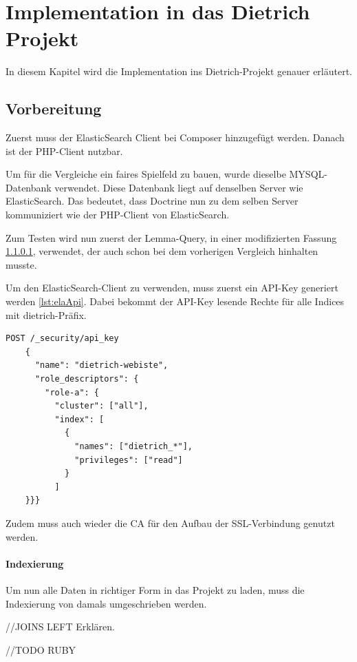 \chapter{Implementation in das Dietrich Projekt}

In diesem Kapitel wird die Implementation ins Dietrich-Projekt genauer erläutert.

\section{Vorbereitung}

Zuerst muss der ElasticSearch Client bei Composer hinzugefügt werden. Danach ist der PHP-Client nutzbar. 

Um für die Vergleiche ein faires Spielfeld zu bauen, wurde dieselbe MYSQL-Datenbank verwendet. Diese Datenbank liegt auf denselben Server wie ElasticSearch. Das bedeutet, dass Doctrine nun zu dem selben Server kommuniziert wie der PHP-Client von ElasticSearch.

Zum Testen wird nun zuerst der Lemma-Query, in einer modifizierten Fassung \ref{lemmaIndexierungEla}, verwendet, der auch schon bei dem vorherigen Vergleich hinhalten musste.

Um den ElasticSearch-Client zu verwenden, muss zuerst ein API-Key generiert werden \ref{lst:elaApi}. Dabei bekommt der API-Key lesende Rechte für alle Indices mit dietrich-Präfix. 

\begin{lstlisting}[language=XML, frame=single, label={lst:elaApi}] 
    POST /_security/api_key
    {
      "name": "dietrich-webiste",
      "role_descriptors": { 
        "role-a": {
          "cluster": ["all"],
          "index": [
            {
              "names": ["dietrich_*"],
              "privileges": ["read"]
            }
          ]
    }}}
\end{lstlisting}

Zudem muss auch wieder die CA für den Aufbau der SSL-Verbindung genutzt werden.


\subsubsection{Indexierung}
\label{lemmaIndexierungEla}

Um nun alle Daten in richtiger Form in das Projekt zu laden, muss die Indexierung von damals umgeschrieben werden. 

//JOINS LEFT Erklären.


//TODO RUBY

